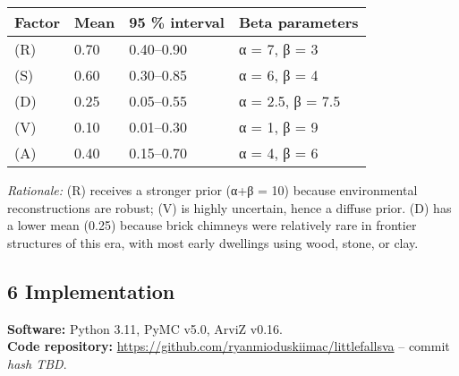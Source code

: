 \documentclass[
  11pt,
]{article}
\begin{document}
\begin{longtable}[]{@{}llll@{}}
\toprule\noalign{}
Factor & Mean & 95 \% interval & Beta parameters \\
\midrule\noalign{}
\endhead
\bottomrule\noalign{}
\endlastfoot
(R) & 0.70 & 0.40--0.90 & α = 7, β = 3 \\
(S) & 0.60 & 0.30--0.85 & α = 6, β = 4 \\
(D) & 0.25 & 0.05--0.55 & α = 2.5, β = 7.5 \\
(V) & 0.10 & 0.01--0.30 & α = 1, β = 9 \\
(A) & 0.40 & 0.15--0.70 & α = 4, β = 6 \\
\end{longtable}

\emph{Rationale:} (R) receives a stronger prior (α+β = 10) because
environmental reconstructions are robust; (V) is highly uncertain, hence
a diffuse prior. (D) has a lower mean (0.25) because brick chimneys were
relatively rare in frontier structures of this era, with most early
dwellings using wood, stone, or clay.

\subsection{6 Implementation}\label{implementation}

\textbf{Software:} Python 3.11, PyMC v5.0, ArviZ v0.16.\\
\textbf{Code repository:}
\url{https://github.com/ryanmioduskiimac/littlefallsva} -- commit
\emph{hash TBD}.
\end{document}
